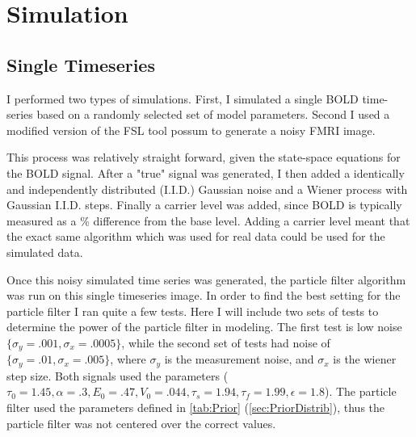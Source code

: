 \chapter{Simulation}

\section{Single Timeseries}
I performed two types of simulations. First, I simulated a single BOLD time-series based
on a randomly selected set of model parameters. Second I used a modified version of the
FSL tool possum to generate a noisy FMRI image. 

This process was relatively straight forward,
given the state-space equations for the BOLD signal. After a "true" signal was generated,
I then added a identically and independently distributed (I.I.D.) Gaussian noise and a Wiener
process with Gaussian I.I.D. steps. Finally a carrier level was added, since BOLD is typically
measured as a \% difference from the
base level. Adding a carrier level meant that the exact same algorithm which was used for 
real data could be used for the simulated data. 

Once this noisy simulated time series was generated, the particle filter algorithm
 was run on this single timeseries image. In order to find the best setting for the
particle filter I ran quite a few tests. Here I will include two sets of tests 
to determine the power of the particle filter in modeling. The first test is
low noise $\{\sigma_y = .001, \sigma_x = .0005\}$, while the second set of
tests had noise of $ \{\sigma_y = .01, \sigma_x = .005\} $, where $\sigma_y$ is the
measurement noise, and $\sigma_x$ is the wiener step size. Both signals used the
parameters ($\tau_0 = 1.45, \alpha = .3, E_0 = .47, V_0 = .044, \tau_s = 1.94, \tau_f = 1.99, \epsilon = 1.8$).
The particle filter used the parameters defined in \autoref{tab:Prior} (\autoref{sec:PriorDistrib}),
thus the particle filter was not centered over the correct values. 

